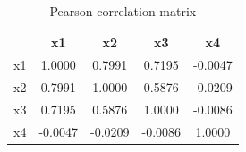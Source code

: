 \begin{table}[h]
\centering
\begin{tabular}{|l|c|c|c|c|}
\hline
 & x1 & x2 & x3 & x4 \\
\hline
x1 & 1.0000 & 0.7991 & 0.7195 & -0.0047 \\
\hline
x2 & 0.7991 & 1.0000 & 0.5876 & -0.0209 \\
\hline
x3 & 0.7195 & 0.5876 & 1.0000 & -0.0086 \\
\hline
x4 & -0.0047 & -0.0209 & -0.0086 & 1.0000 \\
\hline
\end{tabular}
\caption{Pearson correlation matrix}
\label{tab:pearson}
\end{table}